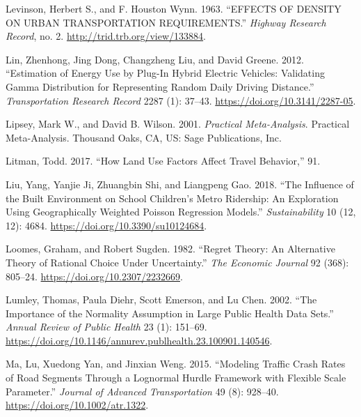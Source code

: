 \documentclass[
  11pt,
  openany]{memoir}
\newlength{\cslhangindent}
\newlength{\cslentryspacingunit} %
\newenvironment{CSLReferences}[2] %
 {%
  \setlength{\parindent}{0pt}
  \ifodd #1
  \let\oldpar\par
  \def\par{\hangindent=\cslhangindent\oldpar}
  \fi
  \setlength{\parskip}{#2\cslentryspacingunit}
 }%
 {}
\begin{document}
\begin{CSLReferences}{1}{0}
\leavevmode{}%
Levinson, Herbert S., and F. Houston Wynn. 1963. {``{EFFECTS OF DENSITY ON URBAN TRANSPORTATION REQUIREMENTS}.''} \emph{Highway Research Record}, no. 2. \url{http://trid.trb.org/view/133884}.

\leavevmode{}%
Lin, Zhenhong, Jing Dong, Changzheng Liu, and David Greene. 2012. {``Estimation of {Energy Use} by {Plug}-{In Hybrid Electric Vehicles}: Validating {Gamma Distribution} for {Representing Random Daily Driving Distance}.''} \emph{Transportation Research Record} 2287 (1): 37--43. \url{https://doi.org/10.3141/2287-05}.

\leavevmode{}%
Lipsey, Mark W., and David B. Wilson. 2001. \emph{Practical Meta-Analysis}. Practical Meta-Analysis. {Thousand Oaks, CA, US}: {Sage Publications, Inc}.

\leavevmode{}%
Litman, Todd. 2017. {``How {Land Use Factors Affect Travel Behavior},''} 91.

\leavevmode{}%
Liu, Yang, Yanjie Ji, Zhuangbin Shi, and Liangpeng Gao. 2018. {``The {Influence} of the {Built Environment} on {School Children}'s {Metro Ridership}: An {Exploration Using Geographically Weighted Poisson Regression Models}.''} \emph{Sustainability} 10 (12, 12): 4684. \url{https://doi.org/10.3390/su10124684}.

\leavevmode{}%
Loomes, Graham, and Robert Sugden. 1982. {``Regret {Theory}: An {Alternative Theory} of {Rational Choice Under Uncertainty}.''} \emph{The Economic Journal} 92 (368): 805--24. \url{https://doi.org/10.2307/2232669}.

\leavevmode{}%
Lumley, Thomas, Paula Diehr, Scott Emerson, and Lu Chen. 2002. {``The {Importance} of the {Normality Assumption} in {Large Public Health Data Sets}.''} \emph{Annual Review of Public Health} 23 (1): 151--69. \url{https://doi.org/10.1146/annurev.publhealth.23.100901.140546}.

\leavevmode{}%
Ma, Lu, Xuedong Yan, and Jinxian Weng. 2015. {``Modeling Traffic Crash Rates of Road Segments Through a Lognormal Hurdle Framework with Flexible Scale Parameter.''} \emph{Journal of Advanced Transportation} 49 (8): 928--40. \url{https://doi.org/10.1002/atr.1322}.


\end{CSLReferences}
\end{document}
